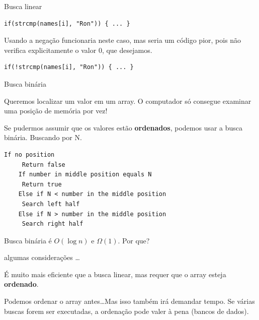 \documentclass{beamer}
\begin{document}
\begin{frame}{Busca linear}
  \begin{lstlisting}[style=normalc]
    if(strcmp(names[i], "Ron")) { ... }
  \end{lstlisting}

  Usando a negação funcionaria neste caso, mas seria um código pior,
  pois não verifica explicitamente o valor 0, que desejamos.

  \begin{lstlisting}[style=normalc]
    if(!strcmp(names[i], "Ron")) { ... }
  \end{lstlisting}

\end{frame}


\begin{frame}{Busca binária}

  Queremos localizar um valor em um array. O computador só consegue
  examinar uma posição de memória por vez!

  Se pudermos assumir que os valores estão \textbf{ordenados}, podemos
  usar a busca binária. Buscando por N.

  \begin{lstlisting}[basicstyle=\ttfamily\scriptsize]
    If no position
     Return false
    If number in middle position equals N
     Return true
    Else if N < number in the middle position
     Search left half
    Else if N > number in the middle position
     Search right half
  \end{lstlisting}

  Busca binária é $O(\log n)$ e $\Omega(1)$. Por que? 

  \framebreak

  algumas considerações \ldots

  É muito mais eficiente que a busca linear, mas requer que o array
  esteja \textbf{ordenado}.

  Podemos ordenar o array antes\ldots Mas isso também irá demandar
  tempo. Se várias buscas forem ser executadas, a ordenação pode valer
  à pena (bancos de dados).

\end{frame}  
\end{document}
